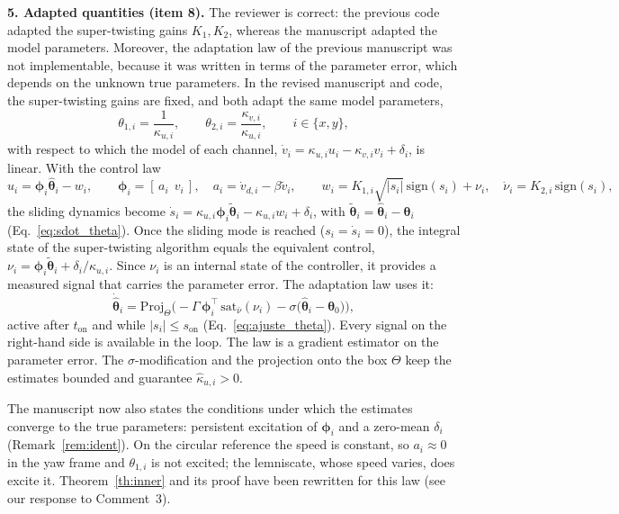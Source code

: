 \begin{reply}
\medskip
\noindent\textbf{5. Adapted quantities (item 8).}
The reviewer is correct: the previous code adapted the super-twisting gains $K_1,K_2$, whereas the manuscript adapted the model parameters. Moreover, the adaptation law of the previous manuscript was not implementable, because it was written in terms of the parameter error, which depends on the unknown true parameters. In the revised manuscript and code, the super-twisting gains are fixed, and both adapt the same model parameters,
\begin{equation*}
\theta_{1,i}=\frac{1}{\kappa_{u,i}},\qquad \theta_{2,i}=\frac{\kappa_{v,i}}{\kappa_{u,i}},\qquad i\in\{x,y\},
\end{equation*}
with respect to which the model of each channel, $\dot v_i=\kappa_{u,i}u_i-\kappa_{v,i}v_i+\delta_i$, is linear. With the control law
\begin{equation*}
u_i=\boldsymbol{\phi}_i\hat{\boldsymbol{\theta}}_i-w_i,\qquad \boldsymbol{\phi}_i=[\,a_i\ \ v_i\,],\quad a_i=\dot v_{d,i}-\beta\tilde v_i,\qquad w_i=K_{1,i}\sqrt{|s_i|}\,\mathrm{sign}(s_i)+\nu_i,\quad \dot\nu_i=K_{2,i}\,\mathrm{sign}(s_i),
\end{equation*}
the sliding dynamics become $\dot s_i=\kappa_{u,i}\boldsymbol{\phi}_i\tilde{\boldsymbol{\theta}}_i-\kappa_{u,i}w_i+\delta_i$, with $\tilde{\boldsymbol{\theta}}_i=\hat{\boldsymbol{\theta}}_i-\boldsymbol{\theta}_i$ (Eq.~\eqref{eq:sdot_theta}). Once the sliding mode is reached ($s_i=\dot s_i=0$), the integral state of the super-twisting algorithm equals the equivalent control, $\nu_i=\boldsymbol{\phi}_i\tilde{\boldsymbol{\theta}}_i+\delta_i/\kappa_{u,i}$. Since $\nu_i$ is an internal state of the controller, it provides a measured signal that carries the parameter error. The adaptation law uses it:
\begin{equation*}
\dot{\hat{\boldsymbol{\theta}}}_i=\mathrm{Proj}_{\Theta}\Big(-\Gamma\,\boldsymbol{\phi}_i^{\top}\,\mathrm{sat}_{\bar\nu}(\nu_i)-\sigma\big(\hat{\boldsymbol{\theta}}_i-\boldsymbol{\theta}_{0}\big)\Big),
\end{equation*}
active after $t_{\mathrm{on}}$ and while $|s_i|\le s_{\mathrm{on}}$ (Eq.~\eqref{eq:ajuste_theta}). Every signal on the right-hand side is available in the loop. The law is a gradient estimator on the parameter error. The $\sigma$-modification and the projection onto the box $\Theta$ keep the estimates bounded and guarantee $\hat\kappa_{u,i}>0$.

The manuscript now also states the conditions under which the estimates converge to the true parameters: persistent excitation of $\boldsymbol{\phi}_i$ and a zero-mean $\delta_i$ (Remark~\ref{rem:ident}). On the circular reference the speed is constant, so $a_i\approx0$ in the yaw frame and $\theta_{1,i}$ is not excited; the lemniscate, whose speed varies, does excite it. Theorem~\ref{th:inner} and its proof have been rewritten for this law (see our response to Comment~3).


\end{reply}
